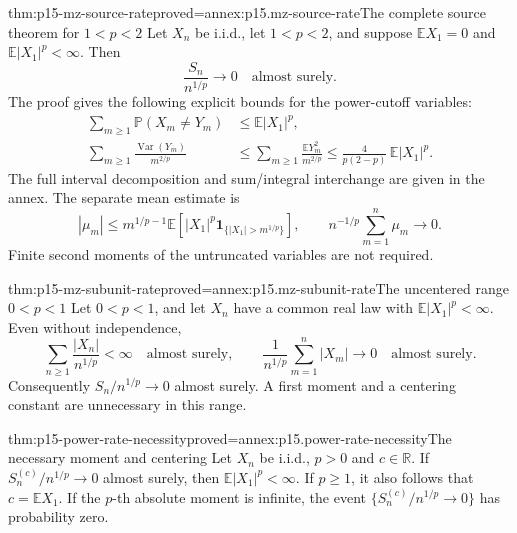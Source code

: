 \begin{hbtheorem}{thm:p15-mz-source-rate}{proved=annex:p15.mz-source-rate}{The complete source theorem for \(1<p<2\)}
Let \(X_n\) be i.i.d., let \(1<p<2\), and suppose
\(\mathbb EX_1=0\) and \(\mathbb E|X_1|^p<\infty\). Then
\[
 \frac{S_n}{n^{1/p}}\longrightarrow0\quad\text{almost surely}.
\]
The proof gives the following explicit bounds for the power-cutoff variables:
\[
 \begin{aligned}
 \sum_{m\geq1}\mathbb P(X_m\ne Y_m)&\leq\mathbb E|X_1|^p,\\
 \sum_{m\geq1}\frac{\operatorname{Var}(Y_m)}{m^{2/p}}
       &\leq\sum_{m\geq1}\frac{\mathbb EY_m^2}{m^{2/p}}
          \leq\frac{4}{p(2-p)}\,\mathbb E|X_1|^p.
 \end{aligned}
\]
The full interval decomposition and sum/integral interchange are given
in the annex. The separate mean estimate is
\[
 |\mu_m|\leq m^{1/p-1}
       \mathbb E\!\left[|X_1|^p\mathbf1_{\{|X_1|>m^{1/p}\}}\right],
 \qquad
 n^{-1/p}\sum_{m=1}^n\mu_m\longrightarrow0.
\]
Finite second moments of the untruncated variables are not required.
\end{hbtheorem}

\begin{hbtheorem}{thm:p15-mz-subunit-rate}{proved=annex:p15.mz-subunit-rate}{The uncentered range \(0<p<1\)}
Let \(0<p<1\), and let \(X_n\) have a common real law with
\(\mathbb E|X_1|^p<\infty\). Even without independence,
\[
 \sum_{n\geq1}\frac{|X_n|}{n^{1/p}}<\infty
       \quad\text{almost surely},\qquad
 \frac1{n^{1/p}}\sum_{m=1}^n|X_m|\longrightarrow0
       \quad\text{almost surely}.
\]
Consequently \(S_n/n^{1/p}\to0\) almost surely. A first moment and
a centering constant are unnecessary in this range.
\end{hbtheorem}

\begin{hblemma}{thm:p15-power-rate-necessity}{proved=annex:p15.power-rate-necessity}{The necessary moment and centering}
Let \(X_n\) be i.i.d., \(p>0\) and \(c\in\mathbb R\).
If \(S_n^{(c)}/n^{1/p}\to0\) almost surely, then
\(\mathbb E|X_1|^p<\infty\). If \(p\geq1\), it also follows that
\(c=\mathbb EX_1\).
If the \(p\)-th absolute moment is infinite, the event
\(\{S_n^{(c)}/n^{1/p}\to0\}\) has probability zero.
\end{hblemma}

